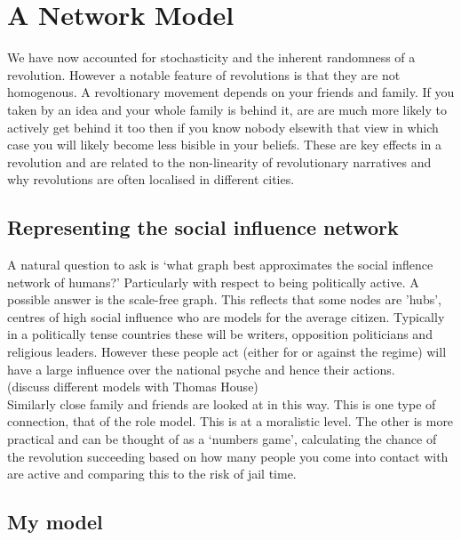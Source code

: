 \chapter{A Network Model}
We have now accounted for stochasticity and the inherent randomness of a revolution. However a notable feature of revolutions is that they are not homogenous. A revoltionary movement depends on your friends and family. If you taken by an idea and your whole family is behind it, are are much more likely to actively get behind it too then if you know nobody elsewith that view in which case you will likely become less bisible in your beliefs. These are key effects in a revolution and are related to the non-linearity of revolutionary narratives and why revolutions are often localised in different cities.
\section{Representing the social influence network}
A natural question to ask is `what graph best approximates the social inflence network of humans?' Particularly with respect to being politically active. A possible answer is the scale-free graph\cite{albert-barabasi}. This reflects that some nodes are 'hubs', centres of high social influence who are models for the average citizen. Typically in a politically tense countries these will be writers, opposition politicians and religious leaders. However these people act (either for or against the regime) will have a large influence over the national psyche and hence their actions.\\
(discuss different models with Thomas House)\\
Similarly close family and friends are looked at in this way. This is one type of connection, that of the role model. This is at a moralistic level. The other is more practical and can be thought of as a `numbers game', calculating the chance of the revolution succeeding based on how many people you come into contact with are active and comparing this to the risk of jail time.
\section{My model}
